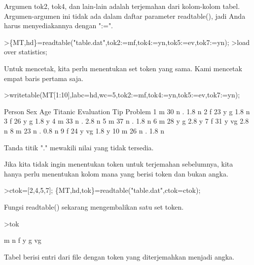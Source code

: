 \documentclass[12pt,Times new roman,letterpaper]{book}
\begin{document}
\begin{eulernootebook}
\begin{eulercomment}
\begin{eulercomment}
\begin{eulernootebook}
\begin{eulercomment}
\begin{eulercomment}
\begin{eulercomment}
\begin{eulercomment}
\begin{eulercomment}
\begin{eulercomment}
\begin{eulercomment}
\begin{eulercomment}
Argumen tok2, tok4, dan lain-lain adalah terjemahan dari kolom-kolom
tabel. Argumen-argumen ini tidak ada dalam daftar parameter
readtable(), jadi Anda harus menyediakannya dengan ":=".
\end{eulercomment}
\begin{eulerprompt}
>\{MT,hd\}=readtable("table.dat",tok2:=mf,tok4:=yn,tok5:=ev,tok7:=yn);
>load over statistics;
\end{eulerprompt}
\begin{eulercomment}
Untuk mencetak, kita perlu menentukan set token yang sama. Kami
mencetak empat baris pertama saja.
\end{eulercomment}
\begin{eulerprompt}
>writetable(MT[1:10],labc=hd,wc=5,tok2:=mf,tok4:=yn,tok5:=ev,tok7:=yn);
\end{eulerprompt}
\begin{euleroutput}
   Person  Sex  Age Titanic Evaluation  Tip Problem
        1    m   30       n          .  1.8       n
        2    f   23       y          g  1.8       n
        3    f   26       y          g  1.8       y
        4    m   33       n          .  2.8       n
        5    m   37       n          .  1.8       n
        6    m   28       y          g  2.8       y
        7    f   31       y         vg  2.8       n
        8    m   23       n          .  0.8       n
        9    f   24       y         vg  1.8       y
       10    m   26       n          .  1.8       n
\end{euleroutput}
\begin{eulercomment}
Tanda titik "." mewakili nilai yang tidak tersedia.

Jika kita tidak ingin menentukan token untuk terjemahan sebelumnya,
kita hanya perlu menentukan kolom mana yang berisi token dan bukan
angka.
\end{eulercomment}
\begin{eulerprompt}
>ctok=[2,4,5,7]; \{MT,hd,tok\}=readtable("table.dat",ctok=ctok);
\end{eulerprompt}
\begin{eulercomment}
Fungsi readtable() sekarang mengembalikan satu set token.
\end{eulercomment}
\begin{eulerprompt}
>tok
\end{eulerprompt}
\begin{euleroutput}
  m
  n
  f
  y
  g
  vg
\end{euleroutput}
\begin{eulercomment}
Tabel berisi entri dari file dengan token yang diterjemahkan menjadi
angka.


\end{eulercomment}
\end{eulercomment}
\end{eulercomment}
\end{eulercomment}
\end{eulercomment}
\end{eulercomment}
\end{eulercomment}
\end{eulercomment}
\end{eulernootebook}
\end{eulercomment}
\end{eulercomment}
\end{eulernootebook}
\end{document}
